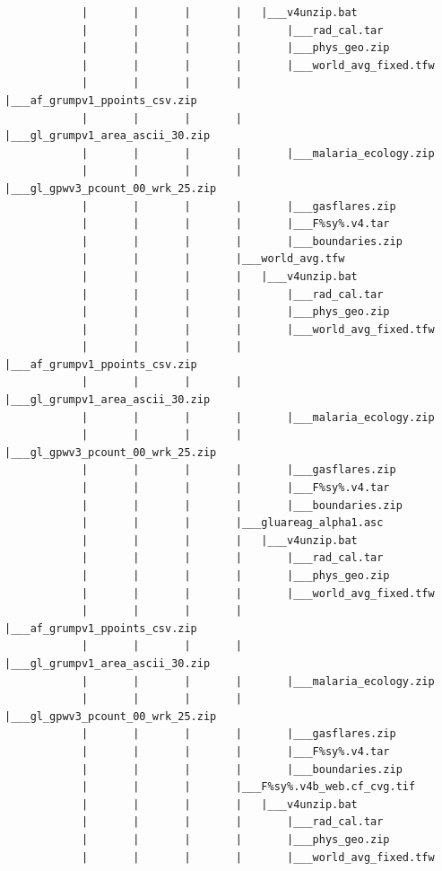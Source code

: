 \documentclass[]{book}
\begin{document}
\begin{verbatim}
            |       |       |       |   |___v4unzip.bat
            |       |       |       |       |___rad_cal.tar
            |       |       |       |       |___phys_geo.zip
            |       |       |       |       |___world_avg_fixed.tfw
            |       |       |       |       |___af_grumpv1_ppoints_csv.zip
            |       |       |       |       |___gl_grumpv1_area_ascii_30.zip
            |       |       |       |       |___malaria_ecology.zip
            |       |       |       |       |___gl_gpwv3_pcount_00_wrk_25.zip
            |       |       |       |       |___gasflares.zip
            |       |       |       |       |___F%sy%.v4.tar
            |       |       |       |       |___boundaries.zip
            |       |       |       |___world_avg.tfw
            |       |       |       |   |___v4unzip.bat
            |       |       |       |       |___rad_cal.tar
            |       |       |       |       |___phys_geo.zip
            |       |       |       |       |___world_avg_fixed.tfw
            |       |       |       |       |___af_grumpv1_ppoints_csv.zip
            |       |       |       |       |___gl_grumpv1_area_ascii_30.zip
            |       |       |       |       |___malaria_ecology.zip
            |       |       |       |       |___gl_gpwv3_pcount_00_wrk_25.zip
            |       |       |       |       |___gasflares.zip
            |       |       |       |       |___F%sy%.v4.tar
            |       |       |       |       |___boundaries.zip
            |       |       |       |___gluareag_alpha1.asc
            |       |       |       |   |___v4unzip.bat
            |       |       |       |       |___rad_cal.tar
            |       |       |       |       |___phys_geo.zip
            |       |       |       |       |___world_avg_fixed.tfw
            |       |       |       |       |___af_grumpv1_ppoints_csv.zip
            |       |       |       |       |___gl_grumpv1_area_ascii_30.zip
            |       |       |       |       |___malaria_ecology.zip
            |       |       |       |       |___gl_gpwv3_pcount_00_wrk_25.zip
            |       |       |       |       |___gasflares.zip
            |       |       |       |       |___F%sy%.v4.tar
            |       |       |       |       |___boundaries.zip
            |       |       |       |___F%sy%.v4b_web.cf_cvg.tif
            |       |       |       |   |___v4unzip.bat
            |       |       |       |       |___rad_cal.tar
            |       |       |       |       |___phys_geo.zip
            |       |       |       |       |___world_avg_fixed.tfw

\end{verbatim}
\end{document}
